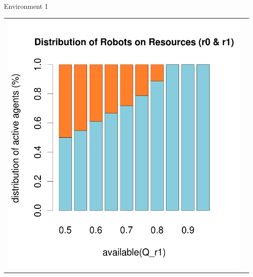 \documentclass[8pt, handout=show,notes=show]{beamer}
\begin{document}
\begin{frame}{Environment 1}
\begin{table}[H]
\begin{tabular}{cc}
\includegraphics[width=\imgSize]{../images/5StaticEnv/barplotAliveR1AndR2_median_env1_normalized}
\end{tabular}
\end{table}
\end{frame}
\end{document}

